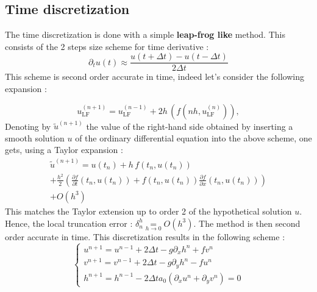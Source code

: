 \documentclass[11pt,a4paper]{report}
\begin{document}
\begin{multicols}{2}
    \subsection{Time discretization}
    The time discretization is done with a simple \textbf{leap-frog like} method. This consists of the 2 steps size scheme for time derivative :
    $$\partial_t u(t) \approx \frac{u(t + \Delta t) - u(t - \Delta t)}{2\Delta t}$$
    This scheme is second order accurate in time, indeed let's consider the following expansion :

    $$u^{(n+1)}_{\text{LF}}=u^{(n-1)}_{\text{LF}}+2h\,\left(f(nh,u^{(n)}_{\text{LF}})\right),$$
    Denoting by $\tilde u^{(n+1)}$ the value of the right-hand side obtained by inserting a smooth solution $u$ of the ordinary differential equation  into the above scheme, one gets, using a Taylor expansion :
    \begin{multline*}
        \tilde u^{(n+1)}=u(t_n)+h\,f(t_n,u(t_n))\\
        +\frac{h^2}{2}\left(\frac{\partial f}{\partial t}(t_n,u(t_n))+f(t_n,u(t_n))\frac{\partial f}{\partial x}(t_n,u(t_n))\right) \\
        +O(h^3)
    \end{multline*}
    This matches the Taylor extension up to order 2 of the hypothetical solution $u$. Hence, the local truncation error : $\delta^h_n \underset{h \rightarrow 0}{=} O(h^3)$. The method is then second order accurate in time.
    This discretization results in the following scheme :
    \begin{equation}
        \label{eq:10}
        \begin{cases}
            u^{n+1}  = u^{n-1} + 2\Delta t -g \partial_x h^n + fv^n \\
            v^{n+1}  = v^{n-1} + 2\Delta t -g \partial_y h^n - fu^n \\
            h^{n+1}  = h^{n-1} - 2\Delta t a_0( \partial_x u^n + \partial_y v^n) = 0
        \end{cases}
    \end{equation}

\end{multicols}
\end{document}
